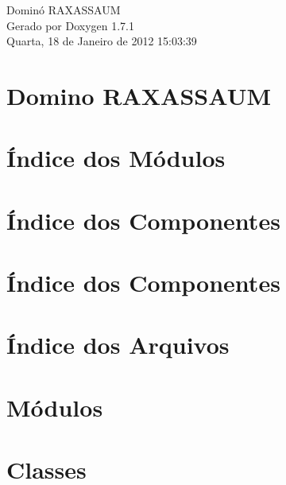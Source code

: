 \documentclass[a4paper]{book}
\begin{document}
\hypersetup{pageanchor=false}
\begin{titlepage}
\vspace*{7cm}
\begin{center}
{\Large Dominó RAXASSAUM }\\
\vspace*{1cm}
{\large Gerado por Doxygen 1.7.1}\\
\vspace*{0.5cm}
{\small Quarta, 18 de Janeiro de 2012 15:03:39}\\
\end{center}
\end{titlepage}
\clearemptydoublepage
{}
\tableofcontents
\clearemptydoublepage
{}
\hypersetup{pageanchor=true}
\chapter{Domino RAXASSAUM}
\label{index}\hypertarget{index}{}
\chapter{Índice dos Módulos}

\chapter{Índice dos Componentes}

\chapter{Índice dos Componentes}

\chapter{Índice dos Arquivos}

\chapter{Módulos}








\chapter{Classes}






























\end{document}
